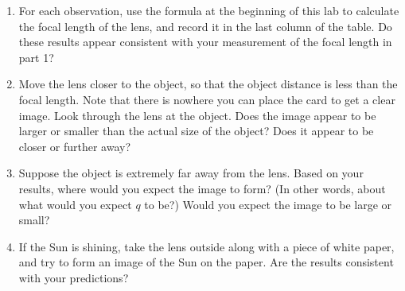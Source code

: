 \begin{enumerate}
\answerspace{1in}

\item For each observation, use the formula at the beginning
of this lab to calculate the focal length of the lens, and record
it in the last column of the table.  Do these results appear consistent
with your measurement of the focal length in part 1?

\answerspace{1in}

\item Move the lens closer to the object, so that the object distance
is less than the focal length.  Note that there is nowhere you can
place the card to get a clear image.  Look through the lens at the
object.  Does the image appear to be larger or smaller than the actual
size of the object?  Does it appear to be closer or further away?

\answerspace{1in}

\item Suppose the object is extremely far away from the lens.
Based on your results, where would you expect the image to form?
(In other words, about what would you expect $q$ to be?)  Would
you expect the image to be large or small?

\answerspace{1in}

\item If the Sun is shining, take the lens outside along with
a piece of white paper, and try to form an image of the Sun on the
paper.  Are the results consistent with your predictions?

\answerspace{1in}

\end{enumerate}


